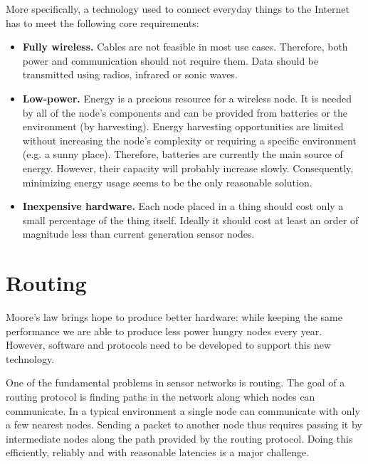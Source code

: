 More specifically, a technology used to connect everyday things to the Internet has to meet the following core requirements:
\begin{itemize}
  \item \textbf{Fully wireless.} Cables are not feasible in most use cases. Therefore, both power and communication should not require them.
Data should be transmitted using radios, infrared or sonic waves.
  \item \textbf{Low-power.} Energy is a precious resource for a wireless node.
It is needed by all of the node's components and can be provided from batteries or the environment (by harvesting).
Energy harvesting opportunities are limited without increasing the node's complexity or requiring a specific environment (e.g. a sunny place).
Therefore, batteries are currently the main source of energy.
However, their capacity will probably increase slowly.
Consequently, minimizing energy usage seems to be the only reasonable solution.
  \item \textbf{Inexpensive hardware.} Each node placed in a thing should cost only a small percentage of the thing itself.
Ideally it should cost at least an order of magnitude less than current generation sensor nodes.
\end{itemize}

\section{Routing}
Moore's law brings hope to produce better hardware: while keeping the same performance we are able to produce less power hungry nodes every year.
However, software and protocols need to be developed to support this new technology.

One of the fundamental problems in sensor networks is routing.
The goal of a routing protocol is finding paths in the network along which nodes can communicate.
In a typical environment a single node can communicate with only a few nearest nodes.
Sending a packet to another node thus requires passing it by intermediate nodes along the path provided by the routing protocol.
Doing this efficiently, reliably and with reasonable latencies is a major challenge.

